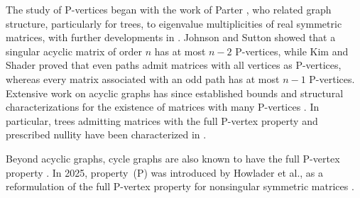 \documentclass[12pt,reqno]{amsart}
\theoremstyle{definition}
\numberwithin{equation}{subsection}
\numberwithin{equation}{section}
\begin{document}
The study of P-vertices began with the work of Parter \cite{Parter}, who related graph structure, particularly for trees, to eigenvalue multiplicities of real symmetric matrices, with further developments in \cite{wiener, hermitian, kim1, kim2}. Johnson and Sutton \cite{hermitian} showed that a singular acyclic matrix of order $n$ has at most $n-2$ P-vertices, while Kim and Shader \cite{kim1} proved that even paths admit matrices with all vertices as P-vertices, whereas every matrix associated with an odd path has at most $n-1$ P-vertices. Extensive work on acyclic graphs has since established bounds and structural characterizations for the existence of matrices with many P-vertices \cite{hermitian,kim1,fons1,fons2,fons3,fons4,fons5,fons6,du1,du2,du3,du4,du5,cruz, kim2}. In particular, trees admitting matrices with the full P-vertex property and prescribed nullity have been characterized in \cite{fons2,fons5,du2}.



Beyond acyclic graphs, cycle graphs are also known to have the full P-vertex property \cite[Theorem 4.2]{fons1}. 
In 2025, property~(P) was introduced by Howlader et al., as a reformulation of the full P-vertex property for nonsingular symmetric matrices \cite[Definition~1.1]{Howlader}.
\end{document}
